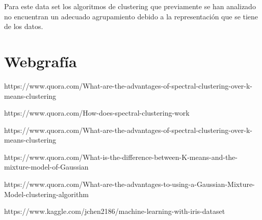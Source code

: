 \documentclass[11pt]{article}
\begin{document}
Para este data set los algoritmos de clustering que previamente se han
analizado no encuentran un adecuado agrupamiento debido a la
representación que se tiene de los datos.

    \section{Webgrafía}\label{webgrafuxeda}

https://www.quora.com/What-are-the-advantages-of-spectral-clustering-over-k-means-clustering

https://www.quora.com/How-does-spectral-clustering-work

https://www.quora.com/What-are-the-advantages-of-spectral-clustering-over-k-means-clustering

https://www.quora.com/What-is-the-difference-between-K-means-and-the-mixture-model-of-Gaussian

https://www.quora.com/What-are-the-advantages-to-using-a-Gaussian-Mixture-Model-clustering-algorithm

https://www.kaggle.com/jchen2186/machine-learning-with-iris-dataset


    
    
    
    
\end{document}
